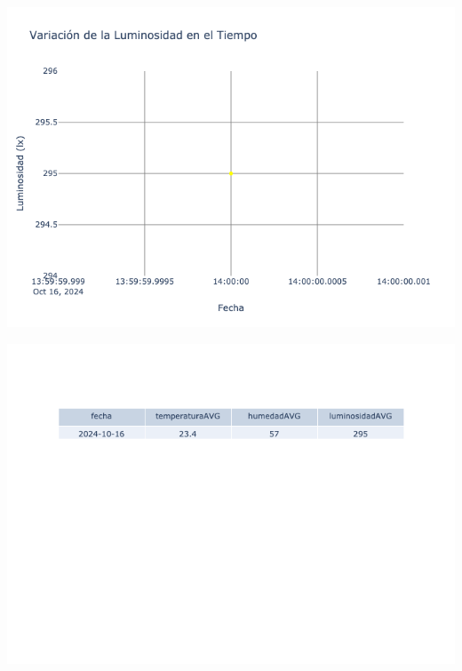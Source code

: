 \documentclass{article}
\begin{document}
    \noindent
    \begin{minipage}{0.48\textwidth}
        \centering
        \includegraphics[width=\textwidth]{../img/poli/LS602-90Dias-03-12-2024.png}
    \end{minipage}
    \hfill
    \begin{minipage}{0.48\textwidth}
        \centering
        \includegraphics[width=\textwidth]{../img/tables/CAVG602-90Dias-03-12-2024.png}
    \end{minipage}
    
\end{document}
